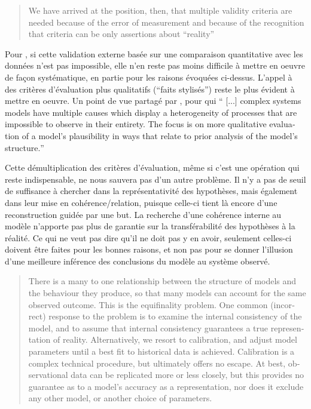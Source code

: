\foreignblockquote{english}[\cite{Hermann1967}]{We have arrived at the position, then, that multiple validity criteria are needed because of the error of measurement and because of the recognition that criteria can be only assertions about \enquote{reality}}


Pour \textcite{Amblard2006}, si cette validation externe basée sur une comparaison quantitative avec les données n'est pas impossible, elle n'en reste pas moins difficile à mettre en oeuvre de façon systématique, en partie pour les raisons évoquées ci-dessus. L'appel à des critères d'évaluation plus qualitatifs (\enquote{faits stylisés}) reste le plus évident à mettre en oeuvre. Un point de vue partagé par \textcite{Batty2001}, pour qui \foreignquote{english}{ [...] complex systems models have multiple causes which display a heterogeneity of processes that are impossible to observe in their entirety. The focus is on more qualitative evaluation of a model’s plausibility in ways that relate to prior analysis of the model’s structure.}

Cette démultiplication des critères d'évaluation, même si c'est une opération qui reste indispensable, ne nous sauvera pas d'un autre problème. Il n'y a pas de seuil de suffisance à chercher dans la représentativité des hypothèses, mais également dans leur mise en cohérence/relation, puisque celle-ci tient là encore d'une reconstruction guidée par une but. La recherche d'une cohérence interne au modèle n'apporte pas plus de garantie sur la transférabilité des hypothèses à la réalité. Ce qui ne veut pas dire qu'il ne doit pas y en avoir, seulement celles-ci doivent être faites pour les bonnes raisons, et non pas pour se donner l'illusion d'une meilleure inférence des conclusions du modèle au système observé.

\foreignblockquote{english}[\cite{OSullivan2004}]{There is a many to one relationship between the structure of models and the behaviour they produce, so that many models can account for the same observed outcome. This is the equifinality problem. One common (incorrect) response to the problem is to examine the internal consistency of the model, and to assume that internal consistency guarantees a true representation of reality. Alternatively, we resort to calibration, and adjust model parameters until a best fit to historical data is achieved. Calibration is a complex technical procedure, but ultimately offers no escape. At best, observational data can be replicated more or less closely, but this provides no guarantee as to a model’s accuracy as a representation, nor does it exclude any other model, or another choice of parameters.}

